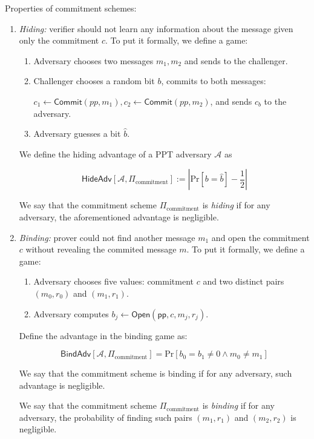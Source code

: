 \documentclass[../lecture-notes.tex]{subfiles}
\begin{document}
\begin{definition}
    Properties of commitment schemes:
    \begin{enumerate}
        \item \textit{Hiding: } verifier should not learn any information about the message given only the commitment $c$. To put it formally, we define a game:
        \begin{enumerate}
            \item Adversary chooses two messages $m_1,m_2$ and sends to the challenger.
            \item Challenger chooses a random bit $b$, commits to both messages: 
            
                $c_1 \gets \mathsf{Commit}(pp, m_1), c_2 \gets \mathsf{Commit}(pp,m_2)$, 
                    and sends $c_b$ to the adversary.
            \item Adversary guesses a bit $\hat{b}$.
        \end{enumerate}
        
        We define the hiding advantage of a PPT adversary $\mathcal{A}$ as 
        
        $$
        \mathsf{HideAdv}[\mathcal{A}, \Pi_{\text{commitment}}] := \left| \text{Pr}[b=\hat{b}] - \frac{1}{2} \right|
        $$
        
        We say that the commitment scheme $\Pi_{\text{commitment}}$ is \textit{hiding} if for any adversary, the aforementioned advantage is negligible.
        
        \item \textit{Binding: } prover could not find another message $m_1$ and open the commitment $c$ without revealing the commited message $m$.
        To put it formally, we define a game:
        
        \begin{enumerate}
            \item Adversary chooses five values: commitment $c$ and two distinct pairs $(m_0,r_0)$ and $(m_1,r_1)$.
            \item Adversary computes $b_j \gets \mathsf{Open}(\mathsf{pp}, c, m_j, r_j)$. 
        \end{enumerate}
        
        Define the advantage in the binding game as:
        
        $$
        \mathsf{BindAdv}[\mathcal{A}, \Pi_{\text{commitment}}] = \text{Pr}[b_0 = b_1 \neq 0 \wedge m_0 \neq m_1]
        $$

        We say that the commitment scheme is binding if for any adversary, such advantage is negligible.



        We say that the commitment scheme $\Pi_{\text{commitment}}$ is \textit{binding} if for any adversary, the probability of finding such pairs 
            $(m_1, r_1)$ and $(m_2, r_2)$ is negligible.
    \end{enumerate}
\end{definition}
\end{document}
